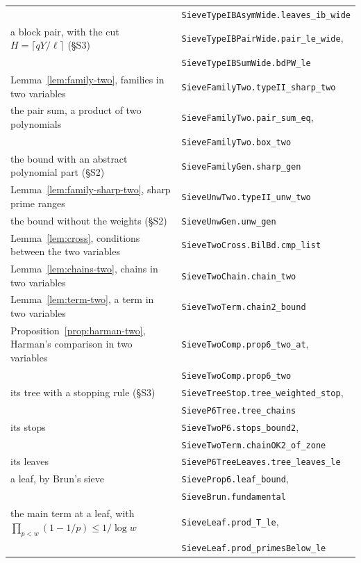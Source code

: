 \documentclass[11pt]{article}
\theoremstyle{definition}
\newcommand{\lean}[1]{\texttt{#1}}
\begin{document}
{\begin{longtable}{@{}>{\raggedright\arraybackslash}p{}l@{}}
 & \lean{SieveTypeIBAsymWide.leaves\_ib\_wide} \\
\quad a block pair, with the cut $H = \lceil qY/\ell \rceil$ (\S S3) & \lean{SieveTypeIBPairWide.pair\_le\_wide}, \\
 & \lean{SieveTypeIBSumWide.bdPW\_le} \\
Lemma~\ref{lem:family-two}, families in two variables & \lean{SieveFamilyTwo.typeII\_sharp\_two} \\
\quad the pair sum, a product of two polynomials & \lean{SieveFamilyTwo.pair\_sum\_eq}, \\
 & \lean{SieveFamilyTwo.box\_two} \\
\quad the bound with an abstract polynomial part (\S S2) & \lean{SieveFamilyGen.sharp\_gen} \\
Lemma~\ref{lem:family-sharp-two}, sharp prime ranges & \lean{SieveUnwTwo.typeII\_unw\_two} \\
\quad the bound without the weights (\S S2) & \lean{SieveUnwGen.unw\_gen} \\
Lemma~\ref{lem:cross}, conditions between the two variables & \lean{SieveTwoCross.BilBd.cmp\_list} \\
Lemma~\ref{lem:chains-two}, chains in two variables & \lean{SieveTwoChain.chain\_two} \\
Lemma~\ref{lem:term-two}, a term in two variables & \lean{SieveTwoTerm.chain2\_bound} \\
Proposition~\ref{prop:harman-two}, Harman's comparison in two variables & \lean{SieveTwoComp.prop6\_two\_at}, \\
 & \lean{SieveTwoComp.prop6\_two} \\
\quad its tree with a stopping rule (\S S3) & \lean{SieveTreeStop.tree\_weighted\_stop}, \\
 & \lean{SieveP6Tree.tree\_chains} \\
\quad its stops & \lean{SieveTwoP6.stops\_bound2}, \\
 & \lean{SieveTwoTerm.chainOK2\_of\_zone} \\
\quad its leaves & \lean{SieveP6TreeLeaves.tree\_leaves\_le} \\
\quad a leaf, by Brun's sieve & \lean{SieveProp6.leaf\_bound}, \\
 & \lean{SieveBrun.fundamental} \\
\quad the main term at a leaf, with $\prod_{p < w}(1 - 1/p) \le 1/\log w$ & \lean{SieveLeaf.prod\_T\_le}, \\
 & \lean{SieveLeaf.prod\_primesBelow\_le} \\

\end{longtable}}
\end{document}
